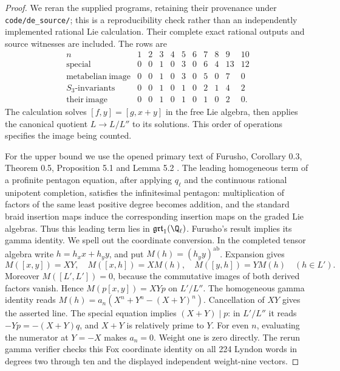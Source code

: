 \begin{proof}
We reran the supplied programs, retaining their provenance under
\texttt{code/de\_source/}; this is a reproducibility check rather than
an independently implemented rational Lie calculation. Their complete
exact rational outputs and source witnesses are included. The rows are
\[
\begin{array}{c|rrrrrrrrrr}
 n&1&2&3&4&5&6&7&8&9&10\\\hline
 \mathrm{special}&0&0&1&0&3&0&6&4&13&12\\
 \mathrm{metabelian\ image}&0&0&1&0&3&0&5&0&7&0\\
 S_3\text{-}\mathrm{invariants}&0&0&1&0&1&0&2&1&4&2\\
 \mathrm{their\ image}&0&0&1&0&1&0&1&0&2&0.
\end{array}
\]
The calculation solves $[f,y]=[g,x+y]$ in the free Lie algebra,
then applies the canonical quotient $L\to L/L''$ to its solutions.
This order of operations specifies the image being counted.

For the upper bound we use the opened primary text of Furusho,
Corollary 0.3, Theorem 0.5, Proposition 5.1 and Lemma 5.2
\cite{DE_Furusho2011}. The leading homogeneous term of a profinite
pentagon equation, after applying $q_\ell$ and the continuous rational
unipotent completion, satisfies the infinitesimal pentagon: multiplication
of factors of the same least positive degree becomes addition, and
the standard braid insertion maps induce the corresponding insertion
maps on the graded Lie algebras. Thus this leading term lies in
$\mathfrak{grt}_1(\Q_\ell)$. Furusho's result implies its gamma identity.
We spell out the coordinate conversion. In the completed tensor algebra
write $h=h_xx+h_yy$, and put $M(h)=(h_yy)^{\mathrm{ab}}$.
Expansion gives
\[
 M([x,y])=XY,\quad M([x,h])=XM(h),\quad
 M([y,h])=YM(h)\quad(h\in L').
\]
Moreover $M([L',L'])=0$, because the commutative images of both
derived factors vanish. Hence $M(p[x,y])=XYp$ on $L'/L''$.
The homogeneous gamma identity reads
$M(h)=a_n(X^n+Y^n-(X+Y)^n)$. Cancellation of $XY$ gives the asserted
line. The special equation implies $(X+Y)\mid p$: in $L'/L''$ it
reads $-Yp=-(X+Y)q$, and $X+Y$ is relatively prime to $Y$.
For even $n$, evaluating the numerator at $Y=-X$ makes $a_n=0$.
Weight one is zero directly. The rerun gamma verifier checks this Fox
coordinate identity on all 224 Lyndon words in degrees two through ten
and the displayed independent weight-nine vectors.
\end{proof}


